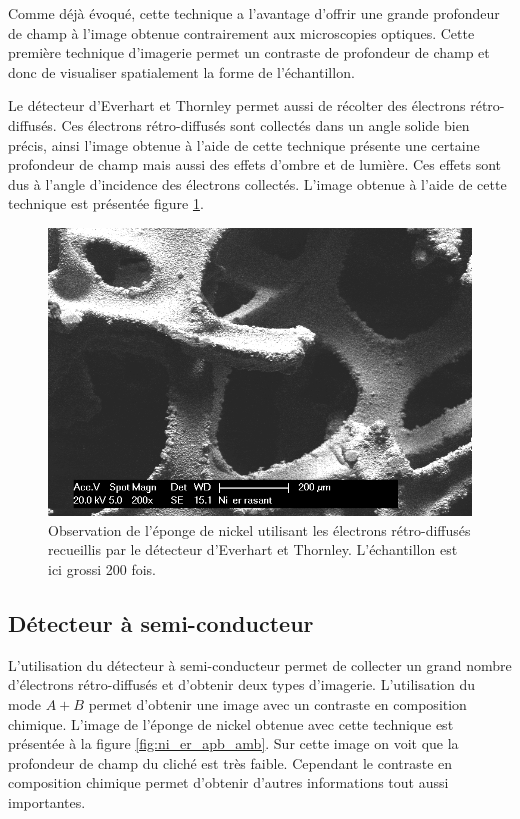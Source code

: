 \documentclass[a4paper,12pt]{article}
\newcommand\ett{Everhart et Thornley\xspace}
\begin{document}
Comme déjà évoqué,
cette technique a l'avantage d'offrir une grande profondeur de champ à l'image obtenue contrairement aux microscopies optiques. Cette première technique d'imagerie permet un contraste de profondeur de champ et donc de visualiser spatialement la forme de l'échantillon.

Le détecteur d'\ett permet aussi de récolter des électrons rétro-diffusés. Ces électrons rétro-diffusés sont
collectés dans un angle solide bien précis, ainsi l'image obtenue à l'aide de cette technique présente une
certaine profondeur de champ mais aussi des effets d'ombre et de lumière. Ces effets sont dus à l'angle
d'incidence des électrons collectés. L'image obtenue à l'aide de cette technique est présentée figure
\ref{fig:ni_er_rasant}.

\begin{figure}[h]
\centering
\includegraphics[width = 0.7 \textwidth]{images/ni_er_rasant.png}
\caption{Observation de l'éponge de nickel utilisant les électrons rétro-diffusés recueillis par le détecteur d'\ett. L'échantillon est ici grossi 200 fois.}
\label{fig:ni_er_rasant}
\end{figure}


\subsection{Détecteur à semi-conducteur}

L'utilisation du détecteur à semi-conducteur permet de collecter un grand nombre d'électrons rétro-diffusés
et d'obtenir deux types d'imagerie. L'utilisation du mode $A+B$ permet d'obtenir une image avec un contraste
en composition chimique. L'image de l'éponge de nickel obtenue avec cette technique est présentée à la figure
\ref{fig:ni_er_apb_amb}. Sur cette image on voit que la profondeur de champ du cliché est très faible. Cependant
le contraste en composition chimique permet d'obtenir d'autres informations tout aussi importantes.
\end{document}
